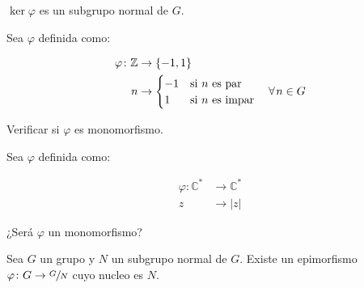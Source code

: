         \begin{observacion}
            $\ker{\varphi}$ es un subgrupo normal de $G$.
        \end{observacion}

        \begin{ejercicio}
            Sea $\varphi$ definida como:

            \begin{align*}
                \varphi \colon \mathbb{Z} &\to \left\{ -1, 1 \right\} \\
                n &\to
                \begin{cases}
                    -1 & \text{si } n \text{ es par} \\
                    1 & \text{si } n \text{ es impar}
                    \end{cases} \quad \forall \mkern2mu n \in G
            \end{align*}

            Verificar si $\varphi$ es monomorfismo.
        \end{ejercicio}

        \begin{ejercicio}
            Sea $\varphi$ definida como:

            \begin{align*}
                \varphi \colon \mathbb{C}^* &\to \mathbb{C}^* \\
                z &\to |z|
            \end{align*}

            ¿Será $\varphi$ un monomorfismo?
        \end{ejercicio}

        \begin{proposicion}
            Sea $G$ un grupo y $N$ un subgrupo normal de $G$.
            Existe un epimorfismo $\varphi \colon G \to \sfrac{G}{N}$ cuyo nucleo es $N$.
        \end{proposicion}

